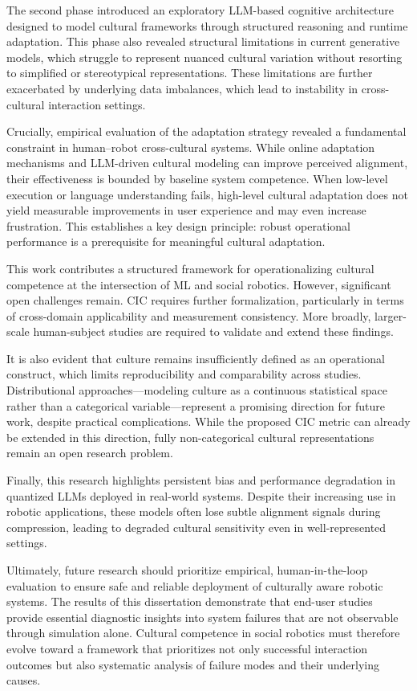 The second phase introduced an exploratory LLM-based cognitive architecture designed to model cultural frameworks through structured reasoning and runtime adaptation. This phase also revealed structural limitations in current generative models, which struggle to represent nuanced cultural variation without resorting to simplified or stereotypical representations. These limitations are further exacerbated by underlying data imbalances, which lead to instability in cross-cultural interaction settings.

Crucially, empirical evaluation of the adaptation strategy revealed a fundamental constraint in human–robot cross-cultural systems. While online adaptation mechanisms and LLM-driven cultural modeling can improve perceived alignment, their effectiveness is bounded by baseline system competence. When low-level execution or language understanding fails, high-level cultural adaptation does not yield measurable improvements in user experience and may even increase frustration. This establishes a key design principle: robust operational performance is a prerequisite for meaningful cultural adaptation.

This work contributes a structured framework for operationalizing cultural competence at the intersection of ML and social robotics. However, significant open challenges remain. CIC requires further formalization, particularly in terms of cross-domain applicability and measurement consistency. More broadly, larger-scale human-subject studies are required to validate and extend these findings.

It is also evident that culture remains insufficiently defined as an operational construct, which limits reproducibility and comparability across studies. Distributional approaches—modeling culture as a continuous statistical space rather than a categorical variable—represent a promising direction for future work, despite practical complications. While the proposed CIC metric can already be extended in this direction, fully non-categorical cultural representations remain an open research problem.

Finally, this research highlights persistent bias and performance degradation in quantized LLMs deployed in real-world systems. Despite their increasing use in robotic applications, these models often lose subtle alignment signals during compression, leading to degraded cultural sensitivity even in well-represented settings.

Ultimately, future research should prioritize empirical, human-in-the-loop evaluation to ensure safe and reliable deployment of culturally aware robotic systems. The results of this dissertation demonstrate that end-user studies provide essential diagnostic insights into system failures that are not observable through simulation alone. Cultural competence in social robotics must therefore evolve toward a framework that prioritizes not only successful interaction outcomes but also systematic analysis of failure modes and their underlying causes.